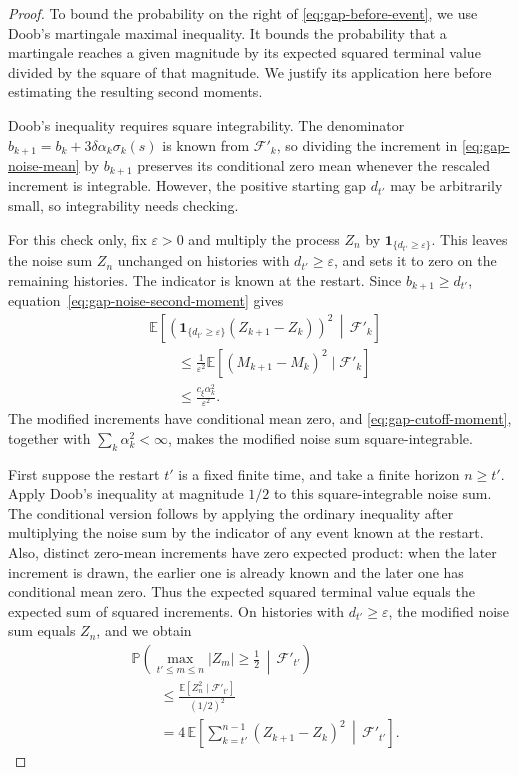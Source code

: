 \begin{proof}
To bound the probability on the right of \eqref{eq:gap-before-event}, we use Doob's martingale maximal inequality. It bounds the probability that a martingale reaches a given magnitude by its expected squared terminal value divided by the square of that magnitude. We justify its application here before estimating the resulting second moments.

Doob's inequality requires square integrability. The denominator $b_{k+1}=b_k+3\delta\alpha_k\sigma_k(s)$ is known from $\mathcal F'_k$, so dividing the increment in \eqref{eq:gap-noise-mean} by $b_{k+1}$ preserves its conditional zero mean whenever the rescaled increment is integrable. However, the positive starting gap $d_{t'}$ may be arbitrarily small, so integrability needs checking.

For this check only, fix $\varepsilon>0$ and multiply the process $Z_n$ by $\mathbf1_{\{d_{t'}\ge\varepsilon\}}$. This leaves the noise sum $Z_n$ unchanged on histories with $d_{t'}\ge\varepsilon$, and sets it to zero on the remaining histories. The indicator is known at the restart. Since $b_{k+1}\ge d_{t'}$, equation~\eqref{eq:gap-noise-second-moment} gives
\begin{equation}
\begin{aligned}
&\mathbb E\!\left[
\left(\mathbf1_{\{d_{t'}\ge\varepsilon\}}(Z_{k+1}-Z_k)\right)^2
\,\middle|\,\mathcal F'_k\right]\\
&\qquad\le
\frac{1}{\varepsilon^2}
\mathbb E[(M_{k+1}-M_k)^2\mid\mathcal F'_k]\\
&\qquad\le\frac{c_\xi\alpha_k^2}{\varepsilon^2}.
\end{aligned}
\label{eq:gap-cutoff-moment}
\end{equation}
The modified increments have conditional mean zero, and \eqref{eq:gap-cutoff-moment}, together with $\sum_k\alpha_k^2<\infty$, makes the modified noise sum square-integrable.

First suppose the restart $t'$ is a fixed finite time, and take a finite horizon $n\ge t'$. Apply Doob's inequality at magnitude $1/2$ to this square-integrable noise sum. The conditional version follows by applying the ordinary inequality after multiplying the noise sum by the indicator of any event known at the restart. Also, distinct zero-mean increments have zero expected product: when the later increment is drawn, the earlier one is already known and the later one has conditional mean zero. Thus the expected squared terminal value equals the expected sum of squared increments. On histories with $d_{t'}\ge\varepsilon$, the modified noise sum equals $Z_n$, and we obtain
\begin{equation}
\begin{aligned}
&\mathbb P\!\left(\max_{t'\le m\le n}|Z_m|\ge\tfrac12
\,\middle|\,\mathcal F'_{t'}\right)\\
&\qquad\le\frac{\mathbb E[Z_n^2\mid\mathcal F'_{t'}]}{(1/2)^2}\\
&\qquad=4\,\mathbb E\!\left[
\sum_{k=t'}^{n-1}(Z_{k+1}-Z_k)^2
\,\middle|\,\mathcal F'_{t'}\right].
\end{aligned}
\label{eq:gap-doob-finite}
\end{equation}


\end{proof}
